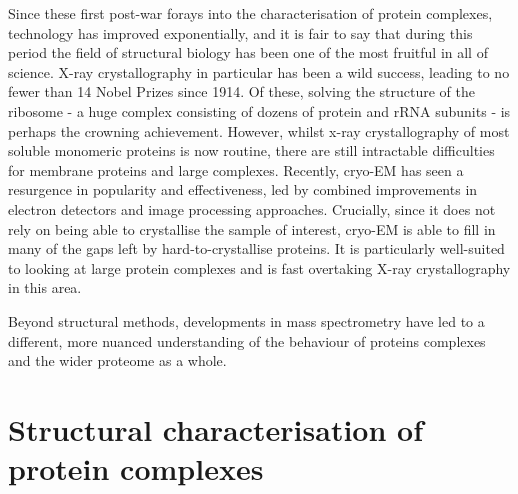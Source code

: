 \documentclass[a4paper,11pt,twoside,openright]{scrbook}
\begin{document}
Since these first post-war forays into the characterisation of protein complexes, technology has improved exponentially, and it is fair to say that during this period the field of structural biology has been one of the most fruitful in all of science. X-ray crystallography in particular has been a wild success, leading to no fewer than 14 Nobel Prizes since 1914. Of these, solving the structure of the ribosome - a huge complex consisting of dozens of protein and rRNA subunits - is perhaps the crowning achievement. However, whilst x-ray crystallography of most soluble monomeric proteins is now routine, there are still intractable difficulties for membrane proteins and large complexes. Recently, cryo-EM has seen a resurgence in popularity and effectiveness, led by combined improvements in electron detectors and image processing approaches. Crucially, since it does not rely on being able to crystallise the sample of interest, cryo-EM is able to fill in many of the gaps left by hard-to-crystallise proteins. It is particularly well-suited to looking at large protein complexes and is fast overtaking X-ray crystallography in this area.

Beyond structural methods, developments in mass spectrometry have led to a different, more nuanced understanding of the behaviour of proteins complexes and the wider proteome as a whole.




\section{Structural characterisation of protein complexes}
\end{document}
